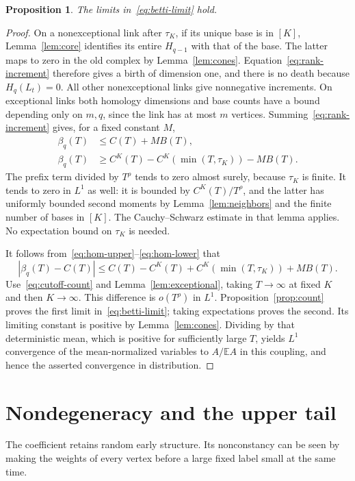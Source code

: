\documentclass[11pt]{article}
\newtheorem{proposition}[theorem]{Proposition}
\theoremstyle{remark}\newtheorem{remark}[theorem]{Remark}
\newcommand{\E}{\mathbb E}
\begin{document}
\begin{proposition}\label{prop:betti}
The limits in~\eqref{eq:betti-limit} hold.
\end{proposition}
\begin{proof}
On a nonexceptional link after $\tau_K$, if its unique base is in $[K]$,
Lemma~\ref{lem:core} identifies its entire $H_{q-1}$ with that of the
base. The latter maps to zero in the old complex by Lemma~\ref{lem:cones}.
Equation~\eqref{eq:rank-increment} therefore gives a birth of dimension one,
and there is no death because $H_q(L_t)=0$. All other nonexceptional links
give nonnegative increments. On exceptional links both homology dimensions
and base counts have a bound depending only on $m,q$, since the link has
at most $m$ vertices. Summing~\eqref{eq:rank-increment} gives, for a fixed
constant $M$,
\begin{align}
 \beta_q(T)&\le C(T)+M B(T),\label{eq:hom-upper}\\
 \beta_q(T)&\ge C^K(T)-C^K(\min(T,\tau_K))-M B(T).
 \label{eq:hom-lower}
\end{align}
The prefix term divided by $T^\rho$ tends to zero almost surely, because
$\tau_K$ is finite. It tends to zero in $L^1$ as well: it is bounded by
$C^K(T)/T^\rho$, and the latter has uniformly bounded second moments by
Lemma~\ref{lem:neighbors} and the finite number of bases in $[K]$.
The Cauchy--Schwarz estimate in that lemma applies. No expectation bound
on $\tau_K$ is needed.

It follows from~\eqref{eq:hom-upper}--\eqref{eq:hom-lower} that
\[
 |\beta_q(T)-C(T)|
 \le C(T)-C^K(T)+C^K(\min(T,\tau_K))+M B(T).
\]
Use~\eqref{eq:cutoff-count} and Lemma~\ref{lem:exceptional}, taking
$T\to\infty$ at fixed $K$ and then $K\to\infty$. This difference is
$o(T^\rho)$ in $L^1$. Proposition~\ref{prop:count} proves the first
limit in~\eqref{eq:betti-limit}; taking expectations proves the second.
Its limiting constant is positive by Lemma~\ref{lem:cones}.
Dividing by that deterministic mean, which is positive for sufficiently
large $T$, yields $L^1$ convergence of the
mean-normalized variables to $A/\E A$ in this coupling, and hence the
asserted convergence in distribution.
\end{proof}

\section{Nondegeneracy and the upper tail}\label{sec:tail}
The coefficient retains random early structure. Its nonconstancy can be
seen by making the weights of every vertex before a large fixed label
small at the same time.
\end{document}

